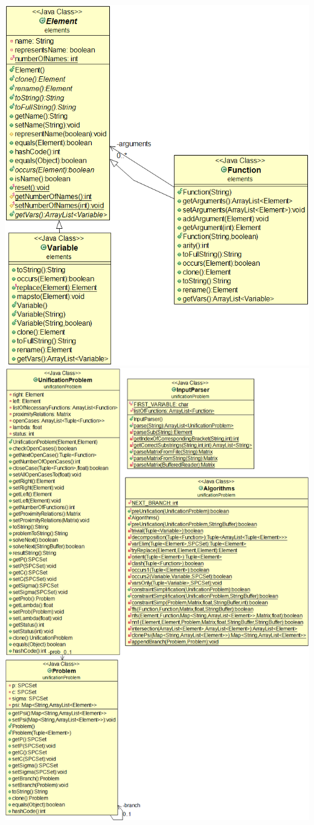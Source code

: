 \documentclass{article}
\begin{document}
\includegraphics[scale=0.5]{ElementsModel}
\newpage
\includegraphics[scale=0.5]{UnificationProblemModel}
\end{document}
